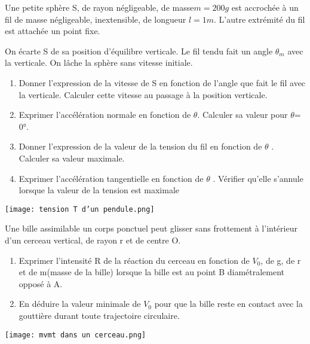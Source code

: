 \documentclass[10pt,a4paper]{article}
\begin{document}
\begin{tcolorbox}[sabour,title=EXERCICE 21]

Une petite sphère S, de rayon négligeable, de masse$ m = 200g$ est accrochée à un fil de masse négligeable, inextensible, de longueur $ l = 1m$. L'autre extrémité du fil est attachée  un point fixe. 

On écarte S de sa position d'équilibre verticale. Le fil tendu fait un angle 
$\theta_m $ avec la verticale. On lâche la sphère sans vitesse initiale.

\begin{minipage}{11cm}


\begin{enumerate}

\item Donner l'expression de la vitesse de S en fonction de l’angle que fait le fil avec la 
verticale. Calculer cette vitesse au passage à la position verticale. 
\item Exprimer l’accélération normale en fonction de $\theta$. Calculer sa valeur pour $\theta$= 0°.
\item Donner l'expression de la valeur de la tension du fil en fonction de $\theta$ . Calculer sa valeur maximale.
\item Exprimer l'accélération tangentielle en fonction de $\theta$ . Vérifier qu'elle s'annule lorsque la valeur de la tension est maximale 
\end{enumerate}
\end{minipage}
\begin{minipage}{6cm}
\texttt{[image: tension T d'un pendule.png]} 

\end{minipage}


\end{tcolorbox}

\begin{tcolorbox}[sabour,title=EXERCICE 22]

\begin{minipage}{11cm}
Une bille assimilable  un corps ponctuel peut glisser sans frottement à l'intérieur d'un cerceau vertical, de rayon r et de centre O. 

\begin{enumerate}
\item Exprimer l'intensité R de la réaction du cerceau en fonction de $V_0$, de g, de r et de m(masse de la bille) lorsque la bille est au point B diamétralement opposé à A. 
\item En déduire la valeur minimale de $V_0$ pour que la bille reste en contact avec la gouttière durant toute trajectoire circulaire. 
\end{enumerate}

\end{minipage}
\begin{minipage}{8cm}
\texttt{[image: mvmt dans un cerceau.png]} 
\end{minipage}
\end{tcolorbox}
\end{document}
